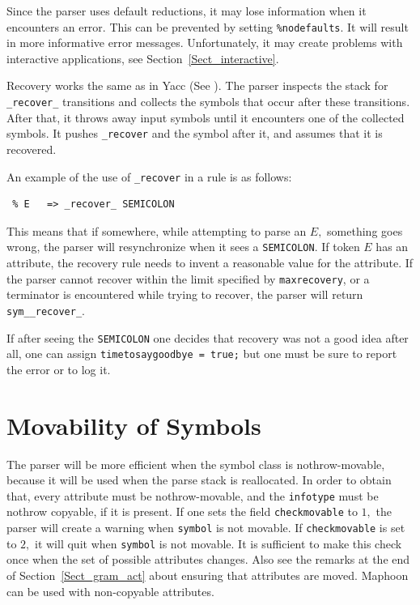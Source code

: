\documentclass{article}
\begin{document}
Since the parser uses default reductions, it may lose
information when it encounters an error. This can be prevented by 
setting \verb+%nodefaults+. It will result in more informative 
error messages. Unfortunately, it may create problems
with interactive applications, see Section~\ref{Sect_interactive}. 

Recovery works the same as in Yacc (See \cite{Yacc_system}). 
The parser
inspects the stack for \verb+_recover_+ transitions
and collects the symbols that occur after these transitions. 
After that, it throws away input symbols until it encounters
one of the collected symbols. 
It pushes \verb+_recover+ and
the symbol after it, and assumes that it is recovered. 

\noindent
An example of the use of \verb+_recover+ in a rule is as follows: 
\begin{verbatim}
 % E   => _recover_ SEMICOLON
\end{verbatim}
This means that if somewhere, while attempting to parse an $ E, $ 
something goes wrong, the 
parser will resynchronize when it sees a \verb+SEMICOLON+.
If token $ E $ has an attribute, the recovery rule needs to 
invent a reasonable value for the attribute.
If the parser cannot recover within the limit 
specified by \verb|maxrecovery|, 
or a terminator is encountered while trying to recover, 
the parser will return \verb+sym__recover_+. 

If after seeing the \verb+SEMICOLON+ one decides that recovery was not
a good idea after all, one can assign 
\verb+timetosaygoodbye = true;+ but one must be sure to
report the error or to log it.

\section{Movability of Symbols}

The parser will be more efficient when the symbol class is nothrow-movable,
because it will be used when the parse stack is reallocated. 
In order to obtain that, every attribute must be nothrow-movable,
and the \verb+infotype+ must be nothrow copyable, if it is present. 
If one sets the field \verb+checkmovable+ to $ 1, $ the parser
will create a warning when \verb+symbol+ is not movable.
If \verb+checkmovable+ is set to $ 2, $ it will quit
when \verb+symbol+ is not movable. 
It is sufficient to make this check once when the set
of possible attributes changes. 
Also see the remarks at the end of Section~\ref{Sect_gram_act}
about ensuring that attributes are moved. 
Maphoon can be used with non-copyable attributes.
\end{document}
